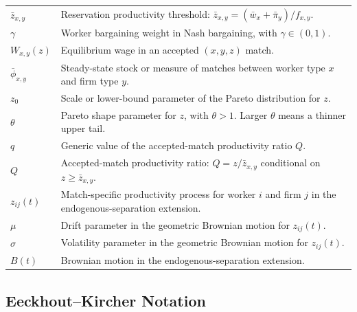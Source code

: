 \documentclass[11pt]{article}
\newcommand{\1}{\mathbf{1}}
\begin{document}
\begin{longtable}{p{}p{}}
$\bar z_{x,y}$ & Reservation productivity threshold: $\bar z_{x,y}=(\bar w_x+\bar \pi_y)/f_{x,y}$. \\
$\gamma$ & Worker bargaining weight in Nash bargaining, with $\gamma\in(0,1)$. \\
$W_{x,y}(z)$ & Equilibrium wage in an accepted $(x,y,z)$ match. \\
$\bar\phi_{x,y}$ & Steady-state stock or measure of matches between worker type $x$ and firm type $y$. \\
$z_0$ & Scale or lower-bound parameter of the Pareto distribution for $z$. \\
$\theta$ & Pareto shape parameter for $z$, with $\theta>1$. Larger $\theta$ means a thinner upper tail. \\
$q$ & Generic value of the accepted-match productivity ratio $Q$. \\
$Q$ & Accepted-match productivity ratio: $Q=z/\bar z_{x,y}$ conditional on $z\geq \bar z_{x,y}$. \\
$z_{ij}(t)$ & Match-specific productivity process for worker $i$ and firm $j$ in the endogenous-separation extension. \\
$\mu$ & Drift parameter in the geometric Brownian motion for $z_{ij}(t)$. \\
$\sigma$ & Volatility parameter in the geometric Brownian motion for $z_{ij}(t)$. \\
$B(t)$ & Brownian motion in the endogenous-separation extension. \\
\end{longtable}

\subsection*{Eeckhout--Kircher Notation}
\end{document}

